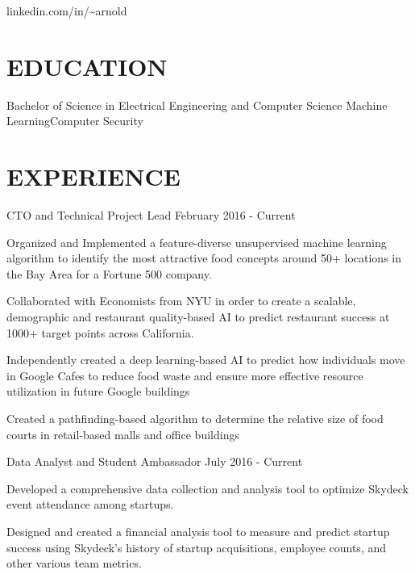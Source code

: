 \documentclass[10pt]{article}
\begin{document}
				 {linkedin.com/in/{\textasciitilde}arnold}      

\section*{EDUCATION}

			{Bachelor of Science in Electrical Engineering and Computer Science}
			{Machine Learning}{Computer Security}


\section*{EXPERIENCE}

								{CTO and Technical Project Lead}
								{February 2016 - Current}                  		
	                   \begin{accomplishments} 
	                    		\item Organized and Implemented a feature-diverse unsupervised machine learning algorithm to identify the most attractive food concepts around 50+ locations in the Bay Area for a Fortune 500 company.
	                    		\item Collaborated with Economists from NYU in order to create a scalable, demographic and restaurant quality-based AI to predict restaurant success at 1000+ target points across California.
	                    		\item Independently created a deep learning-based AI to predict how individuals move in Google Cafes to reduce food waste and ensure more effective resource utilization in future Google buildings
	                    		\item Created a pathfinding-based algorithm to determine the relative size of food courts in retail-based malls and office buildings
	                    \end{accomplishments}
	                    		
	   		
	   			{Data Analyst and Student Ambassador}
	   			{July 2016 - Current}
			  		\begin{accomplishments}
	                   		\item Developed a comprehensive data collection and analysis tool to optimize Skydeck event attendance among startups.
	                   		\item Designed and created a financial analysis tool to measure and predict startup success using Skydeck's history of startup acquisitions, employee counts, and other various team metrics.
	                  \end{accomplishments}
                  	 
\end{document}
